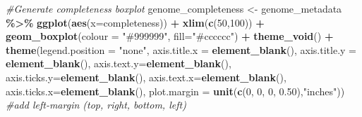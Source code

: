 \documentclass[
]{book}
\newenvironment{Shaded}{\begin{snugshade}}{\end{snugshade}}
\newcommand{\AttributeTok}[1]{\textcolor[rgb]{0.13,0.29,0.53}{#1}}
\newcommand{\CommentTok}[1]{\textcolor[rgb]{0.56,0.35,0.01}{\textit{#1}}}
\newcommand{\DecValTok}[1]{\textcolor[rgb]{0.00,0.00,0.81}{#1}}
\newcommand{\FloatTok}[1]{\textcolor[rgb]{0.00,0.00,0.81}{#1}}
\newcommand{\FunctionTok}[1]{\textcolor[rgb]{0.13,0.29,0.53}{\textbf{#1}}}
\newcommand{\NormalTok}[1]{#1}
\newcommand{\OtherTok}[1]{\textcolor[rgb]{0.56,0.35,0.01}{#1}}
\newcommand{\SpecialCharTok}[1]{\textcolor[rgb]{0.81,0.36,0.00}{\textbf{#1}}}
\newcommand{\StringTok}[1]{\textcolor[rgb]{0.31,0.60,0.02}{#1}}
\begin{document}
\begin{Shaded}
\begin{Highlighting}[]
\CommentTok{\#Generate completeness boxplot}
\NormalTok{genome\_completeness }\OtherTok{\textless{}{-}}\NormalTok{ genome\_metadata }\SpecialCharTok{\%\textgreater{}\%}
        \FunctionTok{ggplot}\NormalTok{(}\FunctionTok{aes}\NormalTok{(}\AttributeTok{x=}\NormalTok{completeness)) }\SpecialCharTok{+}
                \FunctionTok{xlim}\NormalTok{(}\FunctionTok{c}\NormalTok{(}\DecValTok{50}\NormalTok{,}\DecValTok{100}\NormalTok{)) }\SpecialCharTok{+}
                \FunctionTok{geom\_boxplot}\NormalTok{(}\AttributeTok{colour =} \StringTok{"\#999999"}\NormalTok{, }\AttributeTok{fill=}\StringTok{"\#cccccc"}\NormalTok{) }\SpecialCharTok{+}
                \FunctionTok{theme\_void}\NormalTok{() }\SpecialCharTok{+}
                \FunctionTok{theme}\NormalTok{(}\AttributeTok{legend.position =} \StringTok{"none"}\NormalTok{,}
                    \AttributeTok{axis.title.x =} \FunctionTok{element\_blank}\NormalTok{(),}
                    \AttributeTok{axis.title.y =} \FunctionTok{element\_blank}\NormalTok{(),}
                    \AttributeTok{axis.text.y=}\FunctionTok{element\_blank}\NormalTok{(),}
                    \AttributeTok{axis.ticks.y=}\FunctionTok{element\_blank}\NormalTok{(),}
                    \AttributeTok{axis.text.x=}\FunctionTok{element\_blank}\NormalTok{(),}
                    \AttributeTok{axis.ticks.x=}\FunctionTok{element\_blank}\NormalTok{(),}
                    \AttributeTok{plot.margin =} \FunctionTok{unit}\NormalTok{(}\FunctionTok{c}\NormalTok{(}\DecValTok{0}\NormalTok{, }\DecValTok{0}\NormalTok{, }\DecValTok{0}\NormalTok{, }\FloatTok{0.50}\NormalTok{),}\StringTok{"inches"}\NormalTok{)) }\CommentTok{\#add left{-}margin (top, right, bottom, left)}


\end{Highlighting}
\end{Shaded}
\end{document}
